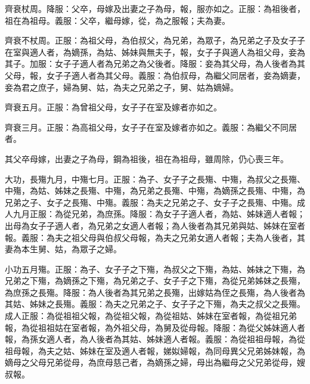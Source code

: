 \begin{pinyinscope}
 齊衰杖周。降服：父卒，母嫁及出妻之子為母，報，服亦如之。正服：為祖後者，祖在為祖母。義服：父卒，繼母嫁，從，為之服報；夫為妻。



 齊衰不杖周。正服：為祖父母，為伯叔父，為兄弟，為眾子，為兄弟之子及女子子在室與適人者，為嫡孫，為姑、姊妹與無夫子，報，女子子與適人為祖父母，妾為其子。加服：女子子適人者為兄弟之為父後者。降服：妾為其父母，為人後者為其父母，報，女子子適人者為其父母。義服：為伯叔母，為繼父同居者，妾為嫡妻，妾為君之庶子，婦為舅、姑，為夫之兄弟之子，舅、姑為嫡婦。



 齊衰五月。正服：為曾祖父母，女子子在室及嫁者亦如之。



 齊衰三月。正服：為高祖父母，女子子在室及嫁者亦如之。義服：為繼父不同居者。



 其父卒母嫁，出妻之子為母，鋼為祖後，祖在為祖母，雖周除，仍心喪三年。



 大功，長殤九月，中殤七月。正服：為子、女子子之長殤、中殤，為叔父之長殤、中殤，為姑、姊妹之長殤、中殤，為兄弟之長殤、中殤，為嫡孫之長殤、中殤，為兄弟之子、女子之長殤、中殤。義服：為夫之兄弟之子、女子子之長殤、中殤。成人九月正服：為從兄弟，為庶孫。降服：為女子子適人者，為姑、姊妹適人者報；出母為女子子適人者，為兄弟之女適人者報；為人後者為其兄弟與姑、姊妹在室者報。義服：為夫之祖父母與伯叔父母報，為夫之兄弟女適人者報；夫為人後者，其妻為本生舅、姑，為眾子之婦。



 小功五月殤。正服：為子、女子子之下殤，為叔父之下殤，為姑、姊妹之下殤，為兄弟之下殤，為嫡孫之下殤，為兄弟之子、女子子之下殤，為從兄弟姊妹之長殤，為庶孫之長殤。降服：為人後者為其兄弟之長殤，出嫁姑為侄之長殤，為人後者為其姑、姊妹之長殤。義服：為夫之兄弟之子、女子子之下殤，為夫之叔父之長殤。成人正服：為從祖祖父報，為從祖父報，為從祖姑、姊妹在室者報，為從祖兄弟報，為從祖祖姑在室者報，為外祖父母，為舅及從母報。降服：為從父姊妹適人者報，為孫女適人者，為人後者為其姑、姊妹適人者報。義服：為從祖祖母報，為從祖母報，為夫之姑、姊妹在室及適人者報，娣姒婦報，為同母異父兄弟姊妹報，為嫡母之父母兄弟從母，為庶母慈己者，為嫡孫之婦，母出為繼母之父兄弟從母，嫂叔報。




\end{pinyinscope}
